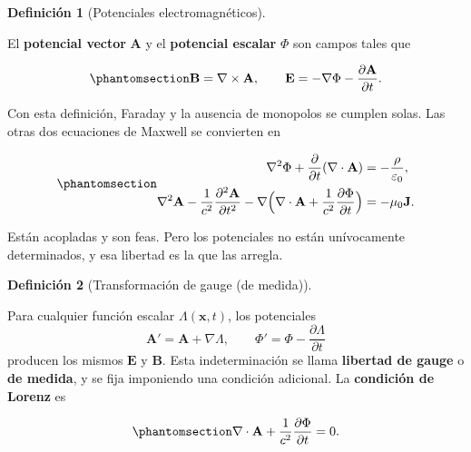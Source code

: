 \documentclass[
  spanish,
  a4paper,
]{scrbook}
\theoremstyle{definition}
\newtheorem{definition}{Definición}[chapter]
\theoremstyle{plain}
\theoremstyle{definition}
\theoremstyle{plain}
\theoremstyle{definition}
\theoremstyle{remark}
\begin{document}
\begin{definition}[Potenciales
electromagnéticos]\protect\hypertarget{def-hip-potenciales}{}\label{def-hip-potenciales}

El \textbf{potencial vector} \(\mathbf A\) y el \textbf{potencial
escalar} \(\Phi\) son campos tales que

\begin{equation}\protect\phantomsection\label{eq-hip-potenciales}{
\mathbf B = \nabla\times\mathbf A, \qquad \mathbf E = -\nabla\Phi - \frac{\partial\mathbf A}{\partial t}.
}\end{equation}

\end{definition}

Con esta definición, Faraday y la ausencia de monopolos se cumplen
solas. Las otras dos ecuaciones de Maxwell se convierten en

\begin{equation}\protect\phantomsection\label{eq-hip-potenciales-ec}{
\begin{aligned}
\nabla^2\Phi + \frac{\partial}{\partial t}(\nabla\cdot\mathbf A) &= -\frac{\rho}{\varepsilon_0},\\
\nabla^2\mathbf A - \frac{1}{c^2}\frac{\partial^2\mathbf A}{\partial t^2}
- \nabla\Big(\nabla\cdot\mathbf A + \frac{1}{c^2}\frac{\partial\Phi}{\partial t}\Big) &= -\mu_0\mathbf J .
\end{aligned}
}\end{equation}

Están acopladas y son feas. Pero los potenciales no están unívocamente
determinados, y esa libertad es la que las arregla.

\begin{definition}[Transformación de gauge (de
medida)]\protect\hypertarget{def-hip-gauge}{}\label{def-hip-gauge}

Para cualquier función escalar \(\Lambda(\mathbf x,t)\), los potenciales
\[
\mathbf A' = \mathbf A + \nabla\Lambda, \qquad \Phi' = \Phi - \frac{\partial\Lambda}{\partial t}
\] producen los mismos \(\mathbf E\) y \(\mathbf B\). Esta
indeterminación se llama \textbf{libertad de gauge} o \textbf{de
medida}, y se fija imponiendo una condición adicional. La
\textbf{condición de Lorenz} es

\begin{equation}\protect\phantomsection\label{eq-hip-lorenz}{
\nabla\cdot\mathbf A + \frac{1}{c^2}\frac{\partial\Phi}{\partial t} = 0 .
}\end{equation}

\end{definition}
\end{document}
